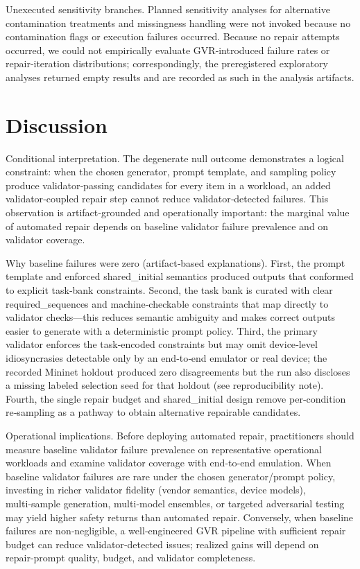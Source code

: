 \documentclass[conference]{IEEEtran}
\begin{document}
Unexecuted sensitivity branches. Planned sensitivity analyses for alternative contamination treatments and missingness handling were not invoked because no contamination flags or execution failures occurred. Because no repair attempts occurred, we could not empirically evaluate GVR‑introduced failure rates or repair‑iteration distributions; correspondingly, the preregistered exploratory analyses returned empty results and are recorded as such in the analysis artifacts.

\section{Discussion}
Conditional interpretation. The degenerate null outcome demonstrates a logical constraint: when the chosen generator, prompt template, and sampling policy produce validator‑passing candidates for every item in a workload, an added validator‑coupled repair step cannot reduce validator‑detected failures. This observation is artifact‑grounded and operationally important: the marginal value of automated repair depends on baseline validator failure prevalence and on validator coverage.

Why baseline failures were zero (artifact‑based explanations). First, the prompt template and enforced shared\_initial semantics produced outputs that conformed to explicit task‑bank constraints. Second, the task bank is curated with clear required\_sequences and machine‑checkable constraints that map directly to validator checks---this reduces semantic ambiguity and makes correct outputs easier to generate with a deterministic prompt policy. Third, the primary validator enforces the task‑encoded constraints but may omit device‑level idiosyncrasies detectable only by an end‑to‑end emulator or real device; the recorded Mininet holdout produced zero disagreements but the run also discloses a missing labeled selection seed for that holdout (see reproducibility note). Fourth, the single repair budget and shared\_initial design remove per‑condition re‑sampling as a pathway to obtain alternative repairable candidates.

Operational implications. Before deploying automated repair, practitioners should measure baseline validator failure prevalence on representative operational workloads and examine validator coverage with end‑to‑end emulation. When baseline validator failures are rare under the chosen generator/prompt policy, investing in richer validator fidelity (vendor semantics, device models), multi‑sample generation, multi‑model ensembles, or targeted adversarial testing may yield higher safety returns than automated repair. Conversely, when baseline failures are non‑negligible, a well‑engineered GVR pipeline with sufficient repair budget can reduce validator‑detected issues; realized gains will depend on repair‑prompt quality, budget, and validator completeness.
\end{document}
